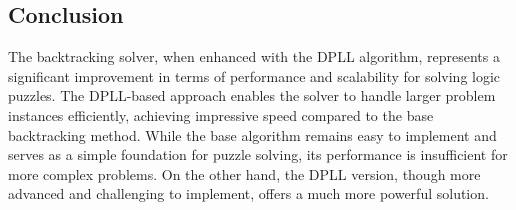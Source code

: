 \subsection*{Conclusion}
The backtracking solver, when enhanced with the DPLL algorithm, represents a significant improvement in terms of performance and scalability for solving logic puzzles. The DPLL-based approach enables the solver to handle larger problem instances efficiently, achieving impressive speed compared to the base backtracking method. While the base algorithm remains easy to implement and serves as a simple foundation for puzzle solving, its performance is insufficient for more complex problems. On the other hand, the DPLL version, though more advanced and challenging to implement, offers a much more powerful solution.
